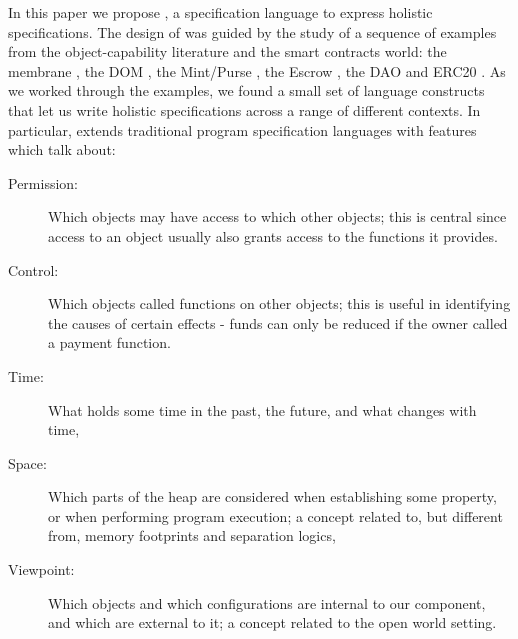 In this paper we propose \Chainmail, a specification language to
express holistic specifications.
The design of \Chainmail was guided by the study of a sequence of
examples from the object-capability literature and the smart contracts world: the
membrane \cite{membranesJavascript}, the DOM \cite{dd,ddd}, the Mint/Purse \cite{MillerPhD}, the Escrow \cite{proxiesECOOP2013}, the DAO \cite{Dao,DaoBug} and
ERC20 \cite{ERC20}.  As we worked through the
examples, we found a small set of language constructs that let us
write holistic specifications across a range of different contexts.
%
In particular, \Chainmail extends 
traditional program specification languages \cite{Leavens-etal07,Meyer92} with features which talk about:
%
\begin{description}
\item[Permission: ] 
Which objects may have access to which other objects; 
this is central since access to an object usually also grants access to the functions it provides.
%
\item[Control: ]
Which objects called functions on other objects; this
 is useful in identifying the causes of certain effects - \eg 
funds can only be reduced if the owner called a payment function.
%
%
\item[Time: ]
What holds some time in  the past, the future, and what changes with time,
\item[Space: ]
Which parts of the heap are considered when establishing some property, or when 
performing program execution; a concept
related to, but different from, memory footprints and separation logics,
\item[Viewpoint: ]
Which objects and which configurations are internal to our component, and which  are
external to it;
a concept related to the open world setting.
\end{description}

